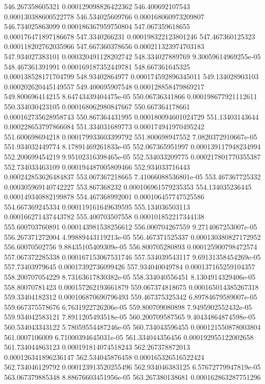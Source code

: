 {546.267358605321 0.000129098826422362
546.400692107543 0.000130388600522778
546.534025609766 0.000168060973209807
546.734025863099 0.000186367959750804
547.067359618655 0.000176471897186678
547.3340266231 0.000198322123801246
547.467360125323 0.000118202762035966
547.667360378656 0.000211323974703183
547.934027383101 0.000320491128202742
548.334027889769 9.30059614969255e-05
548.467361391991 0.000169187352449781
548.667361645325 0.000138528171704799
548.93402864977 0.000174592896345011
549.134028903103 0.000202620445149557
549.400695907548 0.000128858479869217
549.800696414215 8.64743439404475e-05
550.06736341866 0.000198677921112611
550.334030423105 0.000168062980847667
550.667364178661 0.000162735628958743
550.867364431995 0.000180094601024729
551.13403143644 0.000228653797866084
551.334031689773 0.000174941970495242
551.600698694218 0.000179933603399792
551.800698947552 7.0820372910667e-05
551.934032449774 8.17891469261833e-05
552.067365951997 0.000139117948234994
552.200699454219 9.95102316398465e-05
552.534033209775 0.000217801770355387
552.734033463109 0.000194487005809466
552.934033716443 0.000242853626484837
553.067367218665 7.41066088536801e-05
553.467367725332 0.000305969140742227
553.867368232 0.000106961579235353
554.134035236445 0.000149340882199878
554.467368992001 0.000106457747525586
554.667369245334 0.000119161649639595
555.134036503113 0.000166271437443782
555.400703507558 0.000101852217344138
555.600703760891 0.000143981538256612
556.000704267559 9.2714067253007e-05
556.267371272004 4.99889443119213e-05
556.467371525337 0.000130380827172952
556.60070502756 9.88435105409309e-05
556.800705280893 0.000125900798472574
557.067372285338 0.000167153067531746
557.534039543117 9.69131358454269e-05
557.73403979645 0.00017392736099426
557.934040049784 0.000137165259104357
558.200707054229 8.73163617830382e-05
558.334040556451 8.1304914329406e-05
558.80070781423 0.000157262193661879
559.067374818675 0.000165014385267318
559.33404182312 0.000106870690796493
559.467375325342 6.89784679589007e-05
559.667375578676 6.7631922726206e-05
559.800709080898 7.9495902552432e-05
559.934042583121 7.8911205493518e-05
560.200709587565 9.40434864874598e-05
560.534043343122 5.78059554487246e-05
560.734043596455 0.000121550878003804
561.0007106009 6.71000394645031e-05
561.334044356456 0.000192955122002658
561.734044863123 0.000191814074518243
562.267378872013 0.000126341896236147
562.534045876458 0.000165326516522424
562.734046129792 0.000123913520255496
562.934046383125 6.57672779947819e-05
563.067379885348 8.88676603451956e-05
563.267380138681 0.000162863287751296
}
